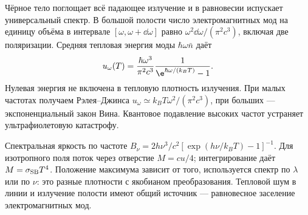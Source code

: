 
Чёрное тело поглощает всё падающее излучение и в равновесии испускает универсальный спектр. В большой полости число электромагнитных мод на единицу объёма в интервале $[\omega,\omega+\dd\omega]$ равно $\omega^2\dd\omega/(\pi^2c^3)$, включая две поляризации. Средняя тепловая энергия моды $\hbar\omega\bar n$ даёт
\begin{equation}
 u_\omega(T)=\frac{\hbar\omega^3}{\pi^2c^3}\frac1{\e^{\hbar\omega/(k_BT)}-1}.
\end{equation}
Нулевая энергия не включена в тепловую плотность излучения. При малых частотах получаем Рэлея–Джинса $u_\omega\simeq k_BT\omega^2/(\pi^2c^3)$, при больших — экспоненциальный закон Вина. Квантовое подавление высоких частот устраняет ультрафиолетовую катастрофу.

Спектральная яркость по частоте $B_\nu=2h\nu^3/c^2[\exp(h\nu/k_BT)-1]^{-1}$. Для изотропного поля поток через отверстие $M=cu/4$; интегрирование даёт $M=\sigma_{\rm SB}T^4$. Положение максимума зависит от того, используется спектр по $\lambda$ или по $\nu$: это разные плотности с якобианом преобразования. Тепловой шум в линии и излучение полости имеют общий источник — равновесное заселение электромагнитных мод.
